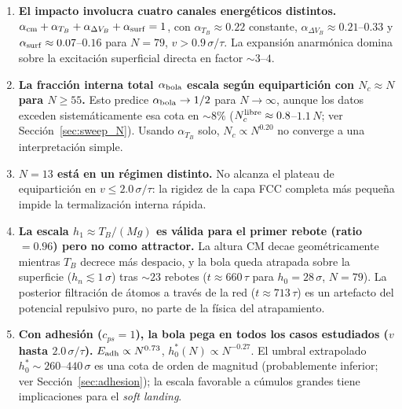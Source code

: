 \documentclass[aps,pre,twocolumn,reprint,superscriptaddress]{revtex4-2}
\begin{document}
\begin{enumerate}

    \item \textbf{El impacto involucra cuatro canales energéticos distintos.}
    $\alpha_{\rm cm}+\alpha_{T_B}+\alpha_{\Delta V_B}+\alpha_{\rm surf}=1$,
    con $\alpha_{T_B}\approx0.22$ constante, $\alpha_{\Delta V_B}\approx0.21$--$0.33$
    y $\alpha_{\rm surf}\approx0.07$--$0.16$ para $N=79$, $v>0.9\,\sigma/\tau$.
    La expansión anarmónica domina sobre la excitación superficial directa en
    factor $\sim3$--$4$.

    \item \textbf{La fracción interna total $\alpha_{\rm bola}$ escala según
    equipartición con $N_c\approx N$ para $N\geq55$.}
    Esto predice $\alpha_{\rm bola}\to1/2$ para $N\to\infty$, aunque los
    datos exceden sistemáticamente esa cota en $\sim8\%$
    ($N_c^{\rm libre}\approx0.8$--$1.1\,N$; ver Sección~\ref{sec:sweep_N}).
    Usando $\alpha_{T_B}$ solo, $N_c\propto N^{0.20}$ no converge a una
    interpretación simple.

    \item \textbf{$N=13$ está en un régimen distinto.}
    No alcanza el plateau de equipartición en $v\leq2.0\,\sigma/\tau$:
    la rigidez de la capa FCC completa más pequeña impide la termalización
    interna rápida.

    \item \textbf{La escala $h_1\approx T_B/(Mg)$ es válida para el primer
    rebote (ratio$=0.96$) pero no como attractor.}
    La altura CM decae geométricamente mientras $T_B$ decrece más despacio,
    y la bola queda atrapada sobre la superficie ($h_n\lesssim1\,\sigma$)
    tras $\sim23$ rebotes ($t\approx660\,\tau$ para $h_0=28\,\sigma$, $N=79$).
    La posterior filtración de átomos a través de la red
    ($t\approx713\,\tau$) es un artefacto del potencial repulsivo puro,
    no parte de la física del atrapamiento.

    \item \textbf{Con adhesión ($c_{ps}=1$), la bola pega en todos los casos
    estudiados ($v$ hasta $2.0\,\sigma/\tau$).}
    $E_{\rm adh}\propto N^{0.73}$, $h_0^*(N)\propto N^{-0.27}$.
    El umbral extrapolado $h_0^*\sim260$--$440\,\sigma$ es una cota de orden
    de magnitud (probablemente inferior; ver Sección~\ref{sec:adhesion});
    la escala favorable a cúmulos grandes tiene implicaciones para el
    \emph{soft landing}.

\end{enumerate}
\end{document}
